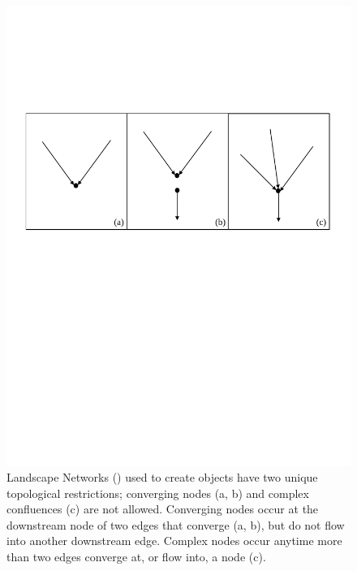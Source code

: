 \documentclass[article]{jss}
\begin{document}
\begin{figure}[htbp]
  \begin{center}
    \includegraphics[width=350pt,keepaspectratio]{Figures/Fig4.pdf}
  \end{center}
  \caption{Landscape Networks () used to create 
    objects have two unique topological restrictions; converging nodes
    (a, b) and complex confluences (c) are not allowed.  Converging
    nodes occur at the downstream node of two edges that converge (a,
    b), but do not flow into another downstream edge. Complex nodes
    occur anytime more than two edges converge at, or flow into, a
    node (c).  \label{Fig4}}
\end{figure}
\end{document}
